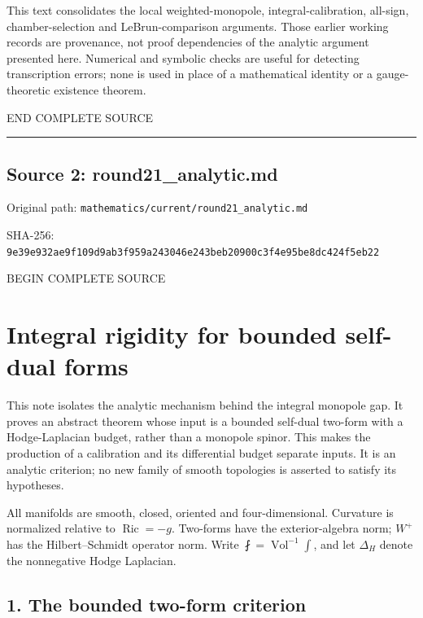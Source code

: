 \documentclass[
  10pt,
]{article}
\begin{document}
This text consolidates the local weighted-monopole,
integral-calibration, all-sign, chamber-selection and LeBrun-comparison
arguments. Those earlier working records are provenance, not proof
dependencies of the analytic argument presented here. Numerical and
symbolic checks are useful for detecting transcription errors; none is
used in place of a mathematical identity or a gauge-theoretic existence
theorem.

END COMPLETE SOURCE

\begin{center}\rule{0.5\linewidth}{0.5pt}\end{center}

\hypertarget{source-2-round21_analytic.md}{%
\subsection{Source 2:
round21\_analytic.md}\label{source-2-round21_analytic.md}}

Original path: \nolinkurl{mathematics/current/round21_analytic.md}

SHA-256:
\nolinkurl{9e39e932ae9f109d9ab3f959a243046e243beb20900c3f4e95be8dc424f5eb22}

BEGIN COMPLETE SOURCE

\hypertarget{integral-rigidity-for-bounded-self-dual-forms}{%
\section{Integral rigidity for bounded self-dual
forms}\label{integral-rigidity-for-bounded-self-dual-forms}}

This note isolates the analytic mechanism behind the integral monopole
gap. It proves an abstract theorem whose input is a bounded self-dual
two-form with a Hodge-Laplacian budget, rather than a monopole spinor.
This makes the production of a calibration and its differential budget
separate inputs. It is an analytic criterion; no new family of smooth
topologies is asserted to satisfy its hypotheses.

All manifolds are smooth, closed, oriented and four-dimensional.
Curvature is normalized relative to \(\operatorname{Ric}=-g\). Two-forms
have the exterior-algebra norm; \(W^+\) has the Hilbert--Schmidt
operator norm. Write \(\fint=\operatorname{Vol}^{-1}\int\), and let
\(\Delta_H\) denote the nonnegative Hodge Laplacian.

\hypertarget{the-bounded-two-form-criterion}{%
\subsection{1. The bounded two-form
criterion}\label{the-bounded-two-form-criterion}}
\end{document}

